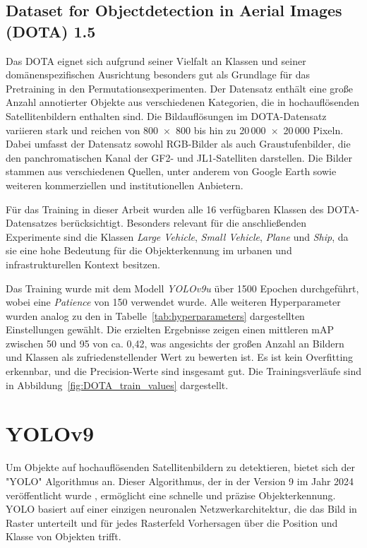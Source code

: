 \subsection{Dataset for Objectdetection in Aerial Images (DOTA) 1.5}
\label{subsec:DOTA}
Das \Acrfull{DOTA} eignet sich aufgrund seiner Vielfalt an Klassen und seiner domänenspezifischen Ausrichtung besonders gut als Grundlage für das Pretraining in den Permutationsexperimenten. Der Datensatz enthält eine große Anzahl annotierter Objekte aus verschiedenen Kategorien, die in hochauflösenden Satellitenbildern enthalten sind. Die Bildauflösungen im \acrshort{DOTA}-Datensatz variieren stark und reichen von 800~$\times$~800 bis hin zu 20\,000~$\times$~20\,000 Pixeln. Dabei umfasst der Datensatz sowohl \acrshort{RGB}-Bilder als auch Graustufenbilder, die den panchromatischen Kanal der GF2- und JL1-Satelliten darstellen. Die Bilder stammen aus verschiedenen Quellen, unter anderem von Google Earth sowie weiteren kommerziellen und institutionellen Anbietern.

Für das Training in dieser Arbeit wurden alle 16 verfügbaren Klassen des DOTA-Datensatzes berücksichtigt. Besonders relevant für die anschließenden Experimente sind die Klassen \textit{Large Vehicle}, \textit{Small Vehicle}, \textit{Plane} und \textit{Ship}, da sie eine hohe Bedeutung für die Objekterkennung im urbanen und infrastrukturellen Kontext besitzen.

Das Training wurde mit dem Modell \textit{YOLOv9u} über 1500 Epochen durchgeführt, wobei eine \textit{Patience} von 150 verwendet wurde. Alle weiteren Hyperparameter wurden analog zu den in Tabelle~\ref{tab:hyperparameters} dargestellten Einstellungen gewählt. Die erzielten Ergebnisse zeigen einen mittleren \acrshort{mAP} zwischen 50 und 95 von ca. 0,42, was angesichts der großen Anzahl an Bildern und Klassen als zufriedenstellender Wert zu bewerten ist. Es ist kein Overfitting erkennbar, und die Precision-Werte sind insgesamt gut. Die Trainingsverläufe sind in Abbildung~\ref{fig:DOTA_train_values} dargestellt.





\section{YOLOv9}
Um Objekte auf hochauflösenden Satellitenbildern zu detektieren, bietet sich der "\Acrfull{YOLO}" Algorithmus an. Dieser Algorithmus, der in der Version 9 im Jahr 2024 veröffentlicht wurde \cite{yolo_v9u_github}, ermöglicht eine schnelle und präzise Objekterkennung. \acrshort{YOLO} basiert auf einer einzigen neuronalen Netzwerkarchitektur, die das Bild in Raster unterteilt und für jedes Rasterfeld Vorhersagen über die Position und Klasse von Objekten trifft. 

